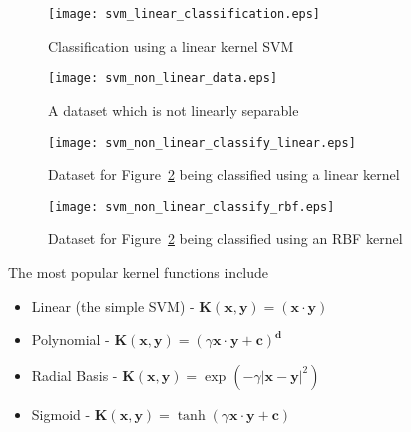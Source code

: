 \begin{figure}
    \centering
    \texttt{[image: svm\_linear\_classification.eps]}
    \caption{Classification using a linear kernel SVM}
    \label{fig:svm_linear_classify}
\end{figure}

\begin{figure}
    \centering
    \texttt{[image: svm\_non\_linear\_data.eps]}
    \caption{A dataset which is not linearly separable}
    \label{fig:svm_non_linear_data}
\end{figure}

\begin{figure}
    \centering
    \texttt{[image: svm\_non\_linear\_classify\_linear.eps]}
    \caption{Dataset for Figure~\ref{fig:svm_non_linear_data} being classified using a linear kernel}
    \label{fig:svm_non_linear_classify_linear}
\end{figure}

\begin{figure}
    \centering
    \texttt{[image: svm\_non\_linear\_classify\_rbf.eps]}
    \caption{Dataset for Figure~\ref{fig:svm_non_linear_data} being classified using an RBF kernel}
    \label{fig:svm_non_linear_classify_rbf}
\end{figure}

The most popular kernel functions include
\begin{itemize}
    \item{Linear (the simple SVM) - $\mathbf{K(x, y)} = (\mathbf{x} \cdot \mathbf{y})$ }
    \item{Polynomial - $\mathbf{K(x, y)} = (\gamma \mathbf{x} \cdot \mathbf{y} + \mathbf{c})^{\mathbf{d}}$}
    \item{Radial Basis - $\mathbf{K(x, y)} = \exp(-\gamma {| \mathbf{x} - \mathbf{y} |}^{2})$}
    \item{Sigmoid - $\mathbf{K(x, y)} = \tanh(\gamma \mathbf{x} \cdot \mathbf{y} + \mathbf{c})$}
\end{itemize}
